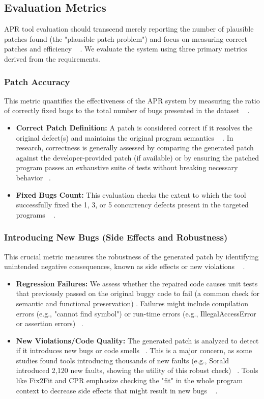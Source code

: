 \subsection{Evaluation Metrics} \label{subsec:metrics}
APR tool evaluation should transcend merely reporting the number of plausible patches found (the "plausible patch problem") and focus on measuring correct patches and efficiency ~\cite{yang2023,liu2021_1}
. We evaluate the system using three primary metrics derived from the requirements.
\subsubsection{Patch Accuracy} This metric quantifies the effectiveness of the APR system by measuring the ratio of correctly fixed bugs to the total number of bugs presented in the dataset ~\cite{yang2025,liu2021_1}
.
\begin{itemize} \item \textbf{Correct Patch Definition:} A patch is considered correct if it resolves the original defect(s) and maintains the original program semantics ~\cite{liu2021_2}
. In research, correctness is generally assessed by comparing the generated patch against the developer-provided patch (if available) or by ensuring the patched program passes an exhaustive suite of tests without breaking necessary behavior ~\cite{yang2023,liu2021_1}. \item \textbf{Fixed Bugs Count:} This evaluation checks the extent to which the tool successfully fixed the 1, 3, or 5 concurrency defects present in the targeted programs ~\cite{liu2021_2}
. \end{itemize}
\subsubsection{Introducing New Bugs (Side Effects and Robustness)} This crucial metric measures the robustness of the generated patch by identifying unintended negative consequences, known as side effects or new violations ~\cite{liyanage2025}
.
\begin{itemize} \item \textbf{Regression Failures:} We assess whether the repaired code causes unit tests that previously passed on the original buggy code to fail (a common check for semantic and functional preservation)
. Failures might include compilation errors (e.g., "cannot find symbol") or run-time errors (e.g., IllegalAccessError or assertion errors) ~\cite{liyanage2025}. \item \textbf{New Violations/Code Quality:} The generated patch is analyzed to detect if it introduces new bugs or code smells ~\cite{liyanage2025}. This is a major concern, as some studies found tools introducing thousands of new faults (e.g., Sorald introduced 2,120 new faults, showing the utility of this robust check) ~\cite{liyanage2025}. Tools like Fix2Fit and CPR emphasize checking the "fit" in the whole program context to decrease side effects that might result in new bugs ~\cite{anand2024}
. \end{itemize}
